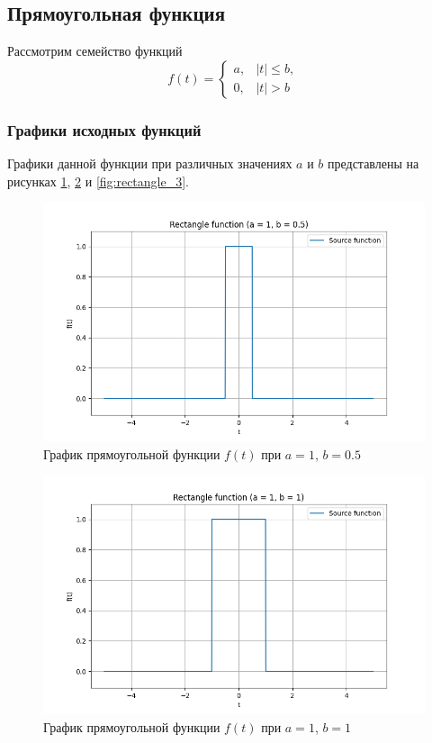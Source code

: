 \subsection{Прямоугольная функция}

Рассмотрим семейство функций 
\begin{equation}
    f(t) = \begin{cases}
        a, & |t| \le b, \\
        0, & |t| > b
    \end{cases}
    \label{eq:rectangle_function}
\end{equation}

\subsubsection{Графики исходных функций}
Графики данной функции при различных значениях $a$ и $b$ представлены на рисунках \ref{fig:rectangle_1}, \ref{fig:rectangle_2} и \ref{fig:rectangle_3}.

\begin{figure}[ht!]
    \centering
    \includegraphics[width=\textwidth]{media/rectangle_1.png}
    \caption{График прямоугольной функции $f(t)$ при $a = 1$, $b = 0.5$}
    \label{fig:rectangle_1}
\end{figure}

\begin{figure}[ht!]
    \centering
    \includegraphics[width=\textwidth]{media/rectangle_2.png}
    \caption{График прямоугольной функции $f(t)$ при $a = 1$, $b = 1$}
    \label{fig:rectangle_2}
\end{figure}

